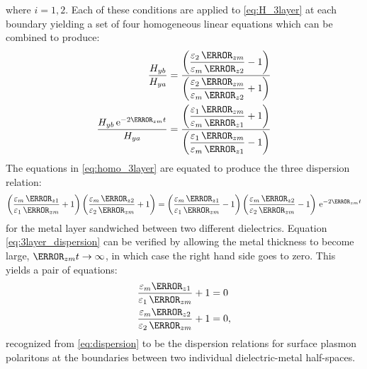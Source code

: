 %
where $i = 1,2$. Each of these conditions are applied to \eqref{eq:H_3layer} at each boundary yielding a set of four homogeneous linear equations which can be combined to produce:
%
\begin{subequations}
  \begin{align}
    \frac{H_{yb}}{H_{ya}} ={}& \ddfrac{\left(\frac{\E_2 \,\A_{zm}}{\E_m \,\A_{z2}} - 1 \right)}   {\left(\frac{\E_2 \,\A_{zm}}{\E_m \,\A_{z2}} + 1 \right)}
    \label{eq:homo1_3layer}\\
    \frac{H_{yb} \, \e^{-2 \A_{zm}t}}{H_{ya}} ={}& \ddfrac{\left(\frac{\E_1 \,\A_{zm}}{\E_m \,\A_{z1}} + 1 \right)}   {\left(\frac{\E_1 \,\A_{zm}}{\E_m \,\A_{z1}} - 1 \right)}
    \label{eq:homo2_3layer}
  \end{align}
  \label{eq:homo_3layer}%
\end{subequations}
%
The equations in \eqref{eq:homo_3layer} are equated to produce the three dispersion relation:
%
\begin{equation}
  \left(\frac{\E_m \,\A_{z1}}{\E_1 \,\A_{zm}} + 1 \right) \left(\frac{\E_m \,\A_{z2}}{\E_2 \,\A_{zm}} + 1 \right) = \left(\frac{\E_m \,\A_{z1}}{\E_1 \,\A_{zm}} - 1 \right) \left(\frac{\E_m \,\A_{z2}}{\E_2 \,\A_{zm}} - 1 \right) \, \e^{-2\A_{zm}t}
  \label{eq:3layer_dispersion}
\end{equation}
%
for the metal layer sandwiched between two different dielectrics. Equation \eqref{eq:3layer_dispersion} can be verified by allowing the metal thickness to become large, $\A_{zm}t \rightarrow \inf$, in which case the right hand side goes to zero. This yields a pair of equations:
%
\begin{subequations}
  \begin{align}
    \frac{\E_m \A_{z1}}{\E_1 \,\A_{zm}} + 1 ={}& 0
    \label{eq:simplified1_3layer_to2layer}\\
    \frac{\E_m \A_{z2}}{\E_2 \,\A_{zm}} + 1 ={}& 0,
    \label{eq:simplified2_3layer_to2layer}
  \end{align}
  \label{eq:simplified_3layer_to2layer}%
\end{subequations}
%
recognized from \eqref{eq:dispersion} to be the dispersion relations for surface plasmon polaritons at the boundaries between two individual dielectric-metal half-spaces.

